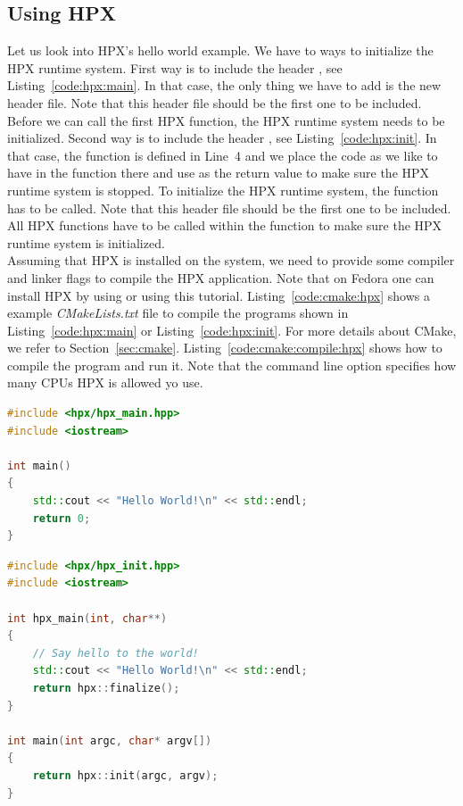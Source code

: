 \documentclass[11pt,fleqn]{book} %
\begin{document}
\subsection*{Using HPX}
Let us look into HPX's hello world example. We have to ways to initialize the HPX runtime system. First way is to include the header , see Listing~\ref{code:hpx:main}. In that case, the only thing we have to add is the new header file. Note that this header file should be the first one to be included. Before we can call the first HPX function, the HPX runtime system needs to be initialized. Second way is to include the header , see Listing~\ref{code:hpx:init}. In that case, the  function is defined in Line~4 and we place the code as we like to have in the  function there and use  as the return value to make sure the HPX runtime system is stopped. To initialize the HPX runtime system, the function  has to be called. Note that this header file should be the first one to be included. All HPX functions have to be called within the  function to make sure the HPX runtime system is initialized. \\

Assuming that HPX is installed on the system, we need to provide some compiler and linker flags to compile the HPX application. Note that on Fedora one can install HPX by using  or using this
tutorial. Listing~\ref{code:cmake:hpx} shows a example \textit{CMakeLists.txt} file to compile the programs shown in Listing~\ref{code:hpx:main} or Listing~\ref{code:hpx:init}. For more details about CMake, we refer to Section~\ref{sec:cmake}. Listing~\ref{code:cmake:compile:hpx} shows how to compile the program and run it. Note that the command line option  specifies how many CPUs HPX is allowed yo use. 


\begin{lstlisting}[language=c++,caption={Initializing the HPX runtime system (I).\label{code:hpx:main}},float,floatplacement=tb]
#include <hpx/hpx_main.hpp>
#include <iostream>

int main()
{
    std::cout << "Hello World!\n" << std::endl;
    return 0;
}
\end{lstlisting}


\begin{lstlisting}[language=c++,caption={Initializing the HPX runtime system (II).\label{code:hpx:init}},float,floatplacement=tb]
#include <hpx/hpx_init.hpp>
#include <iostream>

int hpx_main(int, char**)
{
    // Say hello to the world!
    std::cout << "Hello World!\n" << std::endl;
    return hpx::finalize();
}

int main(int argc, char* argv[])
{
    return hpx::init(argc, argv);
}
\end{lstlisting}
\end{document}
